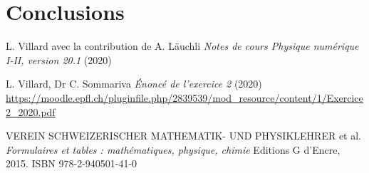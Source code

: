 \documentclass[a4paper,12pt,twoside]{article}
\begin{document}
\section{Conclusions}





\begin{thebibliography}{99}
 L. Villard avec la contribution de A. L\"auchli {\it Notes de cours Physique numérique I-II, version 20.1} (2020)
 
 L. Villard, Dr C. Sommariva {\it \'Enonc\'e de l'exercice 2} (2020)
 \url{https://moodle.epfl.ch/pluginfile.php/2839539/mod_resource/content/1/Exercice2_2020.pdf}
 
 VEREIN SCHWEIZERISCHER MATHEMATIK- UND PHYSIKLEHRER  et al. {\it Formulaires et tables : mathématiques, physique, chimie} Editions G d'Encre, 2015. ISBN 978-2-940501-41-0
 
\end{thebibliography}
\end{document}
